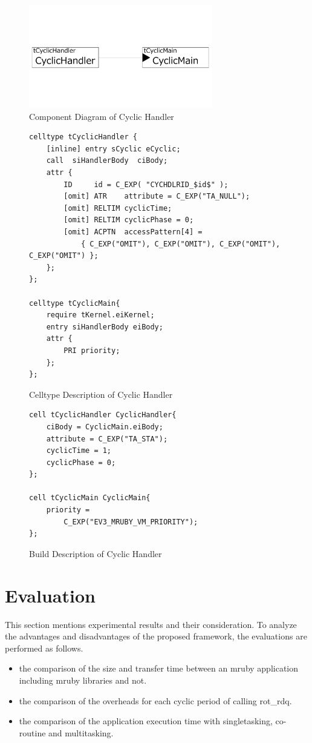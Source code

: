 \documentclass[conference,compsoc]{IEEEtran}
\begin{document}
\begin{figure}[t]
    \centering
    \includegraphics[width=8cm,clip]{figure/cyclic_handler.pdf}
    \caption{Component Diagram of Cyclic Handler}
    \label{fig:cyclic_handler}
\end{figure}
\begin{figure}[t]
    \centering
    \begin{lstlisting}
celltype tCyclicHandler {
    [inline] entry sCyclic eCyclic;
    call  siHandlerBody  ciBody; 
    attr {
    	ID     id = C_EXP( "CYCHDLRID_$id$" );
    	[omit] ATR    attribute = C_EXP("TA_NULL");
    	[omit] RELTIM cyclicTime;
    	[omit] RELTIM cyclicPhase = 0;
        [omit] ACPTN  accessPattern[4] = 
            { C_EXP("OMIT"), C_EXP("OMIT"), C_EXP("OMIT"), C_EXP("OMIT") };
    };
};

celltype tCyclicMain{
    require tKernel.eiKernel;
    entry siHandlerBody eiBody;
    attr {
        PRI priority;
    };
};
    \end{lstlisting}
    \caption{Celltype Description of Cyclic Handler}
    \label{celltype_cyclic_handler}
\end{figure}


\begin{figure}[t]
    \centering
    \begin{lstlisting}
cell tCyclicHandler CyclicHandler{
    ciBody = CyclicMain.eiBody;
    attribute = C_EXP("TA_STA");
    cyclicTime = 1;
    cyclicPhase = 0;
};

cell tCyclicMain CyclicMain{
    priority = 
        C_EXP("EV3_MRUBY_VM_PRIORITY");
};
   \end{lstlisting}
    \caption{Build Description of Cyclic Handler}
    \label{build_cyclic_handler}
\end{figure}

\section{Evaluation}
\label{sec:Evaluation}
This section mentions experimental results and their consideration.
To analyze the advantages and disadvantages of the proposed framework, the evaluations are performed as follows.
\begin{itemize}
        \item the comparison of the size and transfer time between an mruby application including mruby libraries and not.
        \item the comparison of the overheads for each cyclic period of calling rot\_rdq.
        \item the comparison of the application execution time with singletasking, co-routine and multitasking.
\end{itemize}
\end{document}
